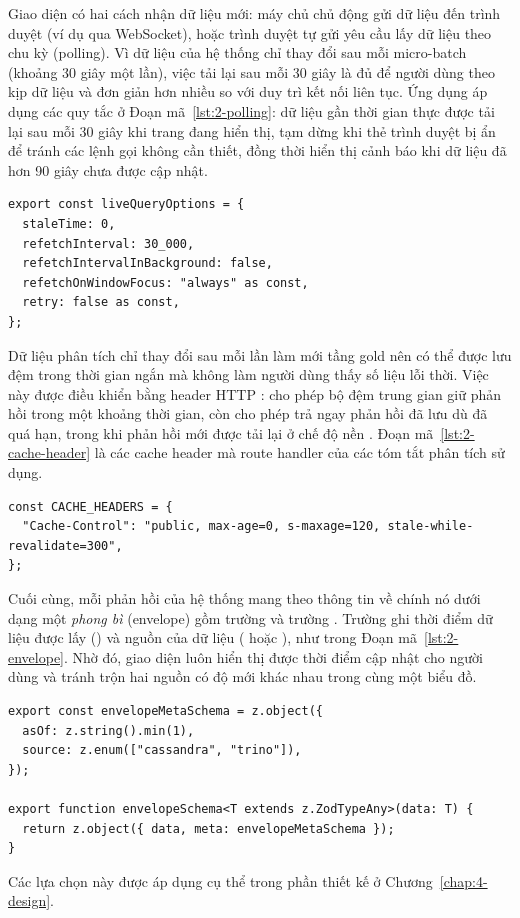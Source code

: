 Giao diện có hai cách nhận dữ liệu mới: máy chủ chủ động gửi dữ liệu đến trình duyệt (ví dụ qua WebSocket), hoặc trình duyệt tự gửi yêu cầu lấy dữ liệu theo chu kỳ (polling). Vì dữ liệu của hệ thống chỉ thay đổi sau mỗi micro-batch (khoảng 30 giây một lần), việc tải lại sau mỗi 30 giây là đủ để người dùng theo kịp dữ liệu và đơn giản hơn nhiều so với duy trì kết nối liên tục. Ứng dụng áp dụng các quy tắc ở Đoạn mã~\ref{lst:2-polling}: dữ liệu gần thời gian thực được tải lại sau mỗi 30 giây khi trang đang hiển thị, tạm dừng khi thẻ trình duyệt bị ẩn để tránh các lệnh gọi không cần thiết, đồng thời hiển thị cảnh báo khi dữ liệu đã hơn 90 giây chưa được cập nhật.

\begin{lstlisting}[caption={Tùy chọn tải lại dữ liệu gần thời gian thực}, label={lst:2-polling}]
export const liveQueryOptions = {
  staleTime: 0,
  refetchInterval: 30_000,
  refetchIntervalInBackground: false,
  refetchOnWindowFocus: "always" as const,
  retry: false as const,
};
\end{lstlisting}

Dữ liệu phân tích chỉ thay đổi sau mỗi lần làm mới tầng gold nên có thể được lưu đệm trong thời gian ngắn mà không làm người dùng thấy số liệu lỗi thời. Việc này được điều khiển bằng header HTTP :  cho phép bộ đệm trung gian giữ phản hồi trong một khoảng thời gian, còn  cho phép trả ngay phản hồi đã lưu dù đã quá hạn, trong khi phản hồi mới được tải lại ở chế độ nền \cite{rfc9111,rfc5861}. Đoạn mã~\ref{lst:2-cache-header} là các cache header mà route handler của các tóm tắt phân tích sử dụng.

\begin{lstlisting}[caption={Các cache header của route handler phân tích}, label={lst:2-cache-header}]
const CACHE_HEADERS = {
  "Cache-Control": "public, max-age=0, s-maxage=120, stale-while-revalidate=300",
};
\end{lstlisting}

Cuối cùng, mỗi phản hồi của hệ thống mang theo thông tin về chính nó dưới dạng một \emph{phong bì} (envelope) gồm trường  và trường . Trường  ghi thời điểm dữ liệu được lấy () và nguồn của dữ liệu ( hoặc ), như trong Đoạn mã~\ref{lst:2-envelope}. Nhờ đó, giao diện luôn hiển thị được thời điểm cập nhật cho người dùng và tránh trộn hai nguồn có độ mới khác nhau trong cùng một biểu đồ.

\begin{lstlisting}[caption={Cấu trúc phong bì của phản hồi}, label={lst:2-envelope}]
export const envelopeMetaSchema = z.object({
  asOf: z.string().min(1),
  source: z.enum(["cassandra", "trino"]),
});

export function envelopeSchema<T extends z.ZodTypeAny>(data: T) {
  return z.object({ data, meta: envelopeMetaSchema });
}
\end{lstlisting}

Các lựa chọn này được áp dụng cụ thể trong phần thiết kế ở Chương~\ref{chap:4-design}.
